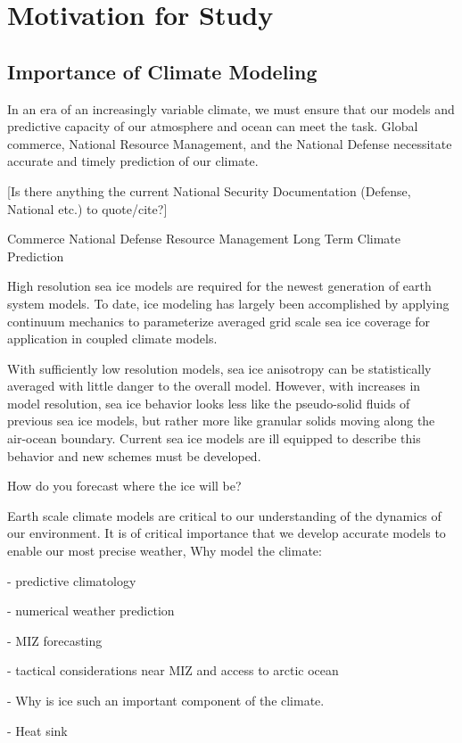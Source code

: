 \label{app:Vestigial}
\section{Motivation for Study}
\subsection{Importance of Climate Modeling}
In an era of an increasingly variable climate, we must ensure that our models and predictive capacity of our atmosphere and ocean can meet the task.  Global commerce, National Resource Management, and the National Defense necessitate accurate and timely prediction of our climate.

[Is there anything the current National Security Documentation (Defense, National etc.) to quote/cite?]

Commerce
National Defense
Resource Management
Long Term Climate Prediction


High resolution sea ice models are required for the newest generation of earth system models.  To date, ice modeling has largely been accomplished by applying continuum mechanics to parameterize averaged grid scale sea ice coverage for application in coupled climate models.

With sufficiently low resolution models, sea ice anisotropy can be statistically averaged with little danger to the overall model.  However, with increases in model resolution, sea ice behavior looks less like the pseudo-solid fluids of previous sea ice models, but rather more like granular solids moving along the air-ocean boundary.  Current sea ice models are ill equipped to describe this behavior and new schemes must be developed.

How do you forecast where the ice will be?

Earth scale climate models are critical to our understanding of the dynamics of our environment.  It is of critical importance that we develop accurate models to enable our most precise weather, 
Why model the climate:

- predictive climatology

- numerical weather prediction

- \ac{MIZ} forecasting

	- tactical considerations near \ac{MIZ} and access to arctic ocean
    
- Why is ice such an important component of the climate.

	- Heat sink
    
